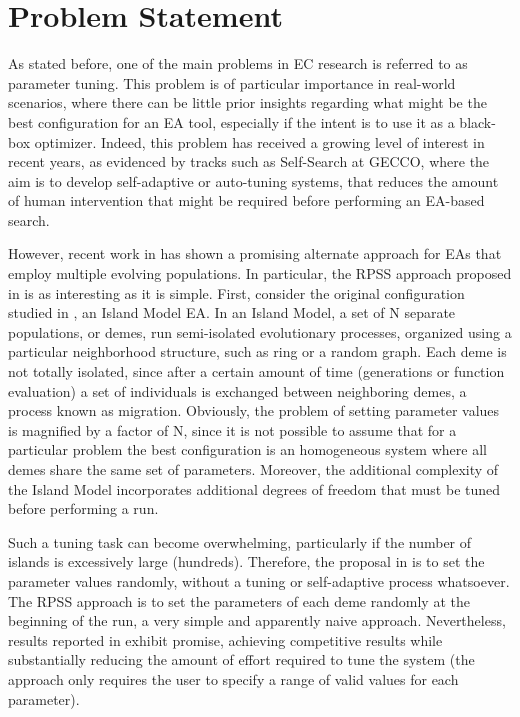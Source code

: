 \documentclass{sig-alternate}
\begin{document}
\section{Problem Statement}
As stated before, one of the main problems in EC research is referred to as parameter tuning.
This problem is of particular importance in real-world scenarios, where there can be little prior insights regarding what might be the best
configuration for an EA tool, especially if the intent is to use it as a black-box optimizer.
Indeed, this problem has received a growing level of interest in recent years, as evidenced by tracks such as Self-Search at GECCO,
where the aim is to develop self-adaptive or auto-tuning systems, that reduces the amount of human intervention that might be required before performing
an EA-based search.

However, recent work in \cite{fuku1,fuku2} has shown a promising alternate approach for EAs that employ multiple evolving populations.
In particular, the RPSS approach proposed in \cite{fuku1} is as interesting as it is simple.
First, consider the original configuration studied in \cite{fuku1,fuku2}, an Island Model EA.
In an Island Model, a set of N separate populations, or demes, run semi-isolated evolutionary processes, organized using a particular
neighborhood structure, such as ring or a random graph.
Each deme is not totally isolated, since after a certain amount of time (generations or function evaluation) a set of individuals is exchanged between
neighboring demes, a process known as migration.
Obviously, the problem of setting parameter values is magnified by a factor of N, since it is not possible to assume that for
a particular problem the best configuration is an homogeneous system where all demes share the same set of parameters.
Moreover, the additional complexity of the Island Model incorporates additional degrees of freedom that must be tuned before
performing a run.

Such a tuning task can become overwhelming, particularly if the number of islands is excessively large (hundreds).
Therefore, the proposal in \cite{fuku1} is to set the parameter values randomly, without a tuning or self-adaptive process whatsoever.
The RPSS approach is to set the parameters of each deme randomly at the beginning of the run, a very simple and apparently naive approach.
Nevertheless, results reported in \cite{fuku1,fuku2} exhibit promise, achieving competitive results while substantially reducing the amount
of effort required to tune the system (the approach only requires the user to specify a range of valid values for each parameter).
\end{document}
